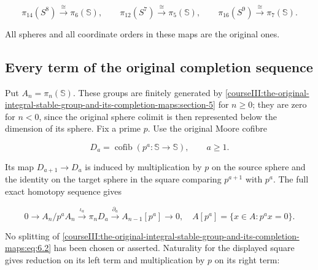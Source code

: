 \begin{equation}
\pi_{14}(S^8)\xrightarrow{\cong}\pi_6(\mathbb S),\qquad
 \pi_{12}(S^7)\xrightarrow{\cong}\pi_5(\mathbb S),\qquad
 \pi_{16}(S^9)\xrightarrow{\cong}\pi_7(\mathbb S).
 \label{courseIII:the-original-integral-stable-group-and-its-completion-maps:eq:5.10}
\end{equation}

All spheres and all coordinate orders in these maps are the original ones.

\subsection{Every term of the original completion sequence}
\label{courseIII:the-original-integral-stable-group-and-its-completion-maps:integral-original-completion}

\label{courseIII:the-original-integral-stable-group-and-its-completion-maps:section-6}\label{courseIII:integral-stable:6}

Put \(A_n=\pi_n(\mathbb S)\). These groups are finitely generated by \cref{courseIII:the-original-integral-stable-group-and-its-completion-maps:section-5} for \(n\geq0\); they are zero for \(n<0\), since the original sphere colimit is then represented below the dimension of its sphere. Fix a prime \(p\). Use the original Moore cofibre

\begin{equation}
D_a=\operatorname{cofib}(p^a:\mathbb S\to\mathbb S),
 \qquad a\geq1.
 \label{courseIII:the-original-integral-stable-group-and-its-completion-maps:eq:6.1}
\end{equation}

Its map \(D_{a+1}\to D_a\) is induced by multiplication by \(p\) on the source sphere and the identity on the target sphere in the square comparing \(p^{a+1}\) with \(p^a\). The full exact homotopy sequence gives

\begin{equation}
0\longrightarrow A_n/p^aA_n\xrightarrow{\iota_a}\pi_nD_a
 \xrightarrow{\partial_a} A_{n-1}[p^a]\longrightarrow0,
 \quad A[p^a]=\{x\in A:p^ax=0\}.
 \label{courseIII:the-original-integral-stable-group-and-its-completion-maps:eq:6.2}
\end{equation}

No splitting of \eqref{courseIII:the-original-integral-stable-group-and-its-completion-maps:eq:6.2} has been chosen or asserted. Naturality for the displayed square gives reduction on its left term and multiplication by \(p\) on its right term:

